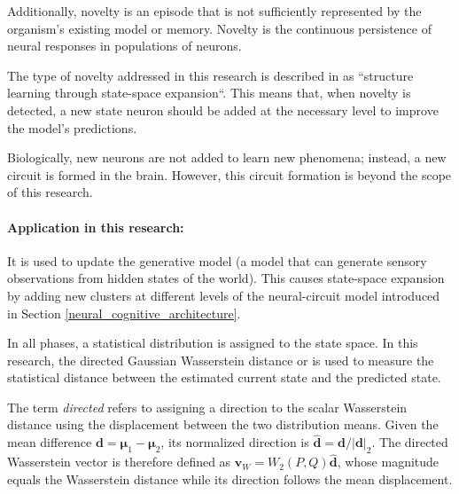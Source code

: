 \documentclass[a4paper]{article}
\begin{document}
      Additionally, novelty is an episode that is not sufficiently represented by the organism's existing model or memory. Novelty is the continuous persistence of neural responses in populations of neurons.

      The type of novelty addressed in this research is described in \cite{smith-2020-an-active-inference-approach-to-modeling-structure-learning} as ``structure learning through state-space expansion``. This means that, when novelty is detected, a new state neuron should be added at the necessary level to improve the model's predictions.

      Biologically, new neurons are not added to learn new phenomena; instead, a new circuit is formed in the brain. However, this circuit formation is beyond the scope of this research.




            \paragraph{Application in this research:} It is used to update the generative model (a model that can generate sensory observations from hidden states of the world). This causes state-space expansion by adding new clusters at different levels of the neural-circuit model introduced in Section \ref{neural_cognitive_architecture}.







               In all phases, a statistical distribution is assigned to the state space. In this research, the directed Gaussian Wasserstein distance \cite{dowson-1982-the-frechet-distance-between-multivariate-normal-distributions} or  is used to measure the statistical distance between the estimated current state and the predicted state.



               The term \emph{directed} refers to assigning a direction to the scalar Wasserstein distance using the displacement between the two distribution means.
               Given the mean difference $\mathbf{d}=\boldsymbol{\mu}_1-\boldsymbol{\mu}_2$, its normalized direction is $\hat{\mathbf{d}}=\mathbf{d}/|\mathbf{d}|_2$.
               The directed Wasserstein vector is therefore defined as $\mathbf{v}_W=W_2(P,Q)\hat{\mathbf{d}}$, whose magnitude equals the Wasserstein distance while its direction follows the mean displacement.
\end{document}
